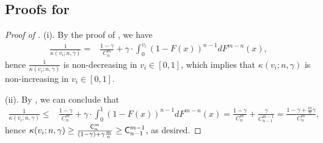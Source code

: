 \subsection{Proofs for }

\begin{proof}[{Proof of }]
(i). By the proof of , we have 
\begin{align}\label{eq:formula_kappa}
\frac{1}{\kappa(v_i;n,\gamma)} 
=& \frac{1-\gamma}{C^m_n} + \gamma \cdot \int_0^{v_i} (1-F(x))^{n-1}dF^{m-n}(x),
\end{align}
hence $\frac{1}{\kappa(v_i;n,\gamma)}$ is non-decreasing in $v_i\in [0,1]$, which implies that $\kappa(v_i;n,\gamma)$ is non-increasing in $v_i\in [0,1]$.

\medskip

\noindent (ii). By , we can conclude that 
\begin{align*}
 \frac{1}{\kappa(v_i;n,\gamma)} 
\leq& \frac{1-\gamma}{C^m_n} + \gamma \cdot \int_0^{1} (1-F(x))^{n-1}dF^{m-n}(x) =  \frac{1-\gamma}{C^m_n} + \frac{\gamma}{C^{m-1}_{n-1}} = \frac{1-\gamma + \frac{m}{n}\gamma}{C^m_n}, 
\end{align*}
hence $\kappa(v_i;n,\gamma)\geq \frac{\mathsf{C}^m_n}{(1-\gamma) + \gamma \frac{m}{n}} \geq \mathsf{C}^{m-1}_{n-1}$, as desired.
\end{proof}

